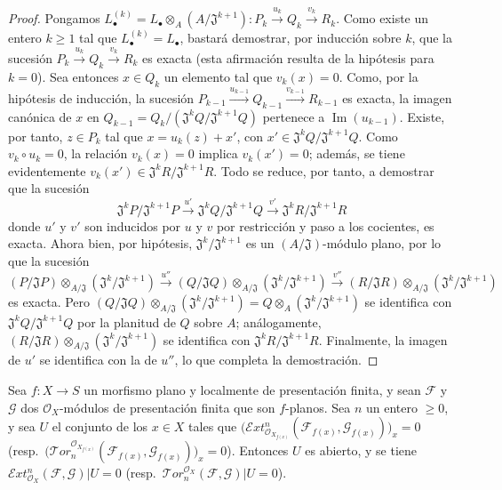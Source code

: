 \begin{proof}
Pongamos
$L_\bullet^{(k)}=L_\bullet\otimes_A(A/\mathfrak J^{k+1}):
P_k\xrightarrow{u_k}Q_k\xrightarrow{v_k}R_k$.
Como existe un entero $k\geq1$ tal que $L_\bullet^{(k)}=L_\bullet$, bastará demostrar, por inducción sobre $k$, que la sucesión
$P_k\xrightarrow{u_k}Q_k\xrightarrow{v_k}R_k$
es exacta (esta afirmación resulta de la hipótesis para $k=0$).
Sea entonces $x\in Q_k$ un elemento tal que $v_k(x)=0$.
Como, por la hipótesis de inducción, la sucesión
$P_{k-1}\xrightarrow{u_{k-1}}Q_{k-1}\xrightarrow{v_{k-1}}R_{k-1}$ es exacta, la imagen canónica de $x$ en
$Q_{k-1}=Q_k/(\mathfrak J^kQ/\mathfrak J^{k+1}Q)$ pertenece a $\operatorname{Im}(u_{k-1})$.
Existe, por tanto, $z\in P_k$ tal que
$x=u_k(z)+x'$, con $x'\in\mathfrak J^kQ/\mathfrak J^{k+1}Q$.
Como $v_k\circ u_k=0$, la relación $v_k(x)=0$ implica $v_k(x')=0$; además, se tiene evidentemente
$v_k(x')\in\mathfrak J^kR/\mathfrak J^{k+1}R$.
Todo se reduce, por tanto, a demostrar que la sucesión
\[
  \mathfrak J^kP/\mathfrak J^{k+1}P\xrightarrow{u'}
  \mathfrak J^kQ/\mathfrak J^{k+1}Q\xrightarrow{v'}
  \mathfrak J^kR/\mathfrak J^{k+1}R
\]
donde $u'$ y $v'$ son inducidos por $u$ y $v$ por restricción y paso a los cocientes, es exacta.
Ahora bien, por hipótesis, $\mathfrak J^k/\mathfrak J^{k+1}$ es un $(A/\mathfrak J)$-módulo plano, por lo que la sucesión
\[
  (P/\mathfrak JP)\otimes_{A/\mathfrak J}
  (\mathfrak J^k/\mathfrak J^{k+1})\xrightarrow{u''}
  (Q/\mathfrak JQ)\otimes_{A/\mathfrak J}
  (\mathfrak J^k/\mathfrak J^{k+1})\xrightarrow{v''}
  (R/\mathfrak JR)\otimes_{A/\mathfrak J}
  (\mathfrak J^k/\mathfrak J^{k+1})
\]
es exacta.
Pero
$(Q/\mathfrak JQ)\otimes_{A/\mathfrak J}
(\mathfrak J^k/\mathfrak J^{k+1})
=Q\otimes_A(\mathfrak J^k/\mathfrak J^{k+1})$
se identifica con $\mathfrak J^kQ/\mathfrak J^{k+1}Q$ por la planitud de $Q$ sobre $A$; análogamente,
$(R/\mathfrak JR)\otimes_{A/\mathfrak J}
(\mathfrak J^k/\mathfrak J^{k+1})$
se identifica con $\mathfrak J^kR/\mathfrak J^{k+1}R$.
Finalmente, la imagen de $u'$ se identifica con la de $u''$, lo que completa la demostración.
\end{proof}

\begin{corollary}[12.3.4]
\label{IV.12.3.4}
Sea $f:X\to S$ un morfismo plano y localmente de presentación finita, y sean $\mathcal F$ y $\mathcal G$ dos $\mathcal O_X$-módulos de presentación finita que son $f$-planos.
Sea $n$ un entero $\geq0$, y sea $U$ el conjunto de los $x\in X$ tales que $\bigl(\mathscr{E}\!xt^n_{\mathcal O_{X_{f(x)}}}
(\mathcal F_{f(x)},\mathcal G_{f(x)})\bigr)_x=0$ \textup{(resp.\ $\bigl(\mathscr{T}\!or_n^{\mathcal O_{X_{f(x)}}}
(\mathcal F_{f(x)},\mathcal G_{f(x)})\bigr)_x=0$)}.
Entonces $U$ es abierto, y se tiene
$\mathscr{E}\!xt^n_{\mathcal O_X}(\mathcal F,\mathcal G)|U=0$
\textup{(resp.\ $\mathscr{T}\!or_n^{\mathcal O_X}(\mathcal F,\mathcal G)|U=0$)}.
\end{corollary}

